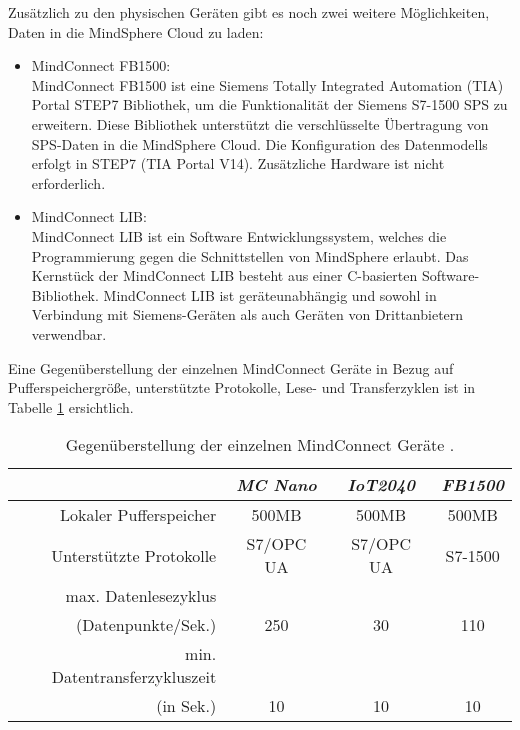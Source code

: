 Zusätzlich zu den physischen Geräten gibt es noch zwei weitere Möglichkeiten, Daten in die MindSphere Cloud zu laden:
\vspace{\baselineskip}

\begin{itemize}
\item MindConnect FB1500:\\
MindConnect FB1500 ist eine Siemens Totally Integrated Automation (TIA) Portal STEP7 Bibliothek, um die Funktionalität der Siemens S7-1500 \acs{SPS} zu erweitern. Diese Bibliothek unterstützt die verschlüsselte Übertragung von \acs{SPS}-Daten in die MindSphere Cloud. Die Konfiguration des Datenmodells erfolgt in STEP7 (TIA Portal V14). Zusätzliche Hardware ist nicht erforderlich.

\item MindConnect LIB:\\
MindConnect LIB ist ein Software Entwicklungssystem, welches die Programmierung gegen die Schnittstellen von MindSphere erlaubt. Das Kernstück der MindConnect LIB besteht aus einer C-basierten Software-Bibliothek. MindConnect LIB ist geräteunabhängig und sowohl in Verbindung mit Siemens-Geräten als auch Geräten von Drittanbietern verwendbar.
\end{itemize}
\vspace{\baselineskip}

Eine Gegenüberstellung der einzelnen MindConnect Geräte in Bezug auf Pufferspeichergröße, unterstützte Protokolle, Lese- und Transferzyklen ist in Tabelle \ref{tab:mindConnect} ersichtlich.

\begin{table}[H]
	\caption{Gegenüberstellung der einzelnen MindConnect Geräte \cite{SiemensWhitepaper}.} 		\label{tab:mindConnect}
	\centering
	\setlength{\tabcolsep}{5mm} %
	\def\arraystretch{1.25} %
	\begin{tabular}{r|ccc}
   		& \emph{MC Nano} & \emph{IoT2040} & \emph{FB1500} \\
    	\hline
    	Lokaler Pufferspeicher & 500MB & 500MB & 500MB \\
    	Unterstützte Protokolle & S7/OPC UA & S7/OPC UA & S7-1500 \\
   	 	max. Datenlesezyklus\\(Datenpunkte/Sek.) & 250 & 30   & 110 \\
        min. Datentransferzykluszeit\\(in Sek.) & 10 & 10   & 10 \\
  	\end{tabular}
\end{table}

